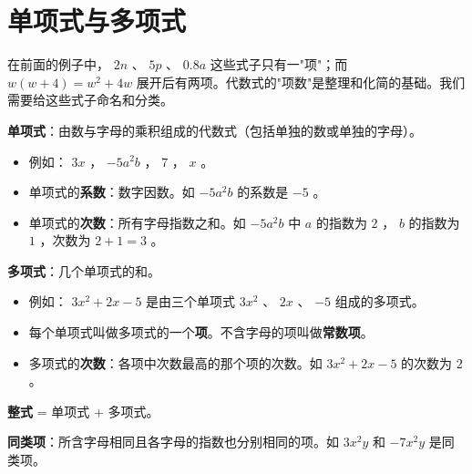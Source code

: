 \section*{单项式与多项式}


\begin{explore}


在前面的例子中， $2n$ 、 $5p$ 、 $0.8a$ 这些式子只有一"项"；而 $w(w + 4) = w^2 + 4w$ 展开后有两项。代数式的"项数"是整理和化简的基础。我们需要给这些式子命名和分类。

\end{explore}

\begin{understand}


\textbf{单项式}：由数与字母的乘积组成的代数式（包括单独的数或单独的字母）。

\begin{itemize}
  \item 例如： $3x$ ， $-5a^2b$ ， $7$ ， $x$ 。
  \item 单项式的\textbf{系数}：数字因数。如 $-5a^2b$ 的系数是 $-5$ 。
  \item 单项式的\textbf{次数}：所有字母指数之和。如 $-5a^2b$ 中 $a$ 的指数为 $2$ ， $b$ 的指数为 $1$ ，次数为 $2 + 1 = 3$ 。
\end{itemize}


\textbf{多项式}：几个单项式的和。

\begin{itemize}
  \item 例如： $3x^2 + 2x - 5$ 是由三个单项式 $3x^2$ 、 $2x$ 、 $-5$ 组成的多项式。
  \item 每个单项式叫做多项式的一个\textbf{项}。不含字母的项叫做\textbf{常数项}。
  \item 多项式的\textbf{次数}：各项中次数最高的那个项的次数。如 $3x^2 + 2x - 5$ 的次数为 $2$ 。
\end{itemize}


\textbf{整式} = 单项式 + 多项式。

\textbf{同类项}：所含字母相同且各字母的指数也分别相同的项。如 $3x^2y$ 和 $-7x^2y$ 是同类项。

\end{understand}


